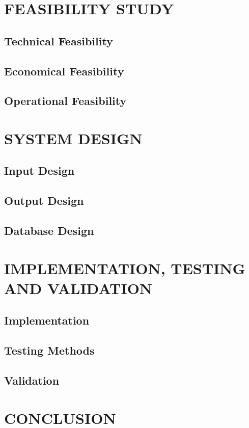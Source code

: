 \chapter{FEASIBILITY STUDY}
%
\section{Technical Feasibility}
%
\section{Economical Feasibility}
%
\section{Operational Feasibility}
%
\chapter{SYSTEM DESIGN}
%
\section{Input Design}
%
\section{Output Design}
%
\section{Database Design}
%
%
%
%
\chapter{IMPLEMENTATION, TESTING AND VALIDATION}
%
\section{Implementation}
%
\section{Testing Methods}
\section{Validation}
%
%
\chapter{CONCLUSION}
%
%
